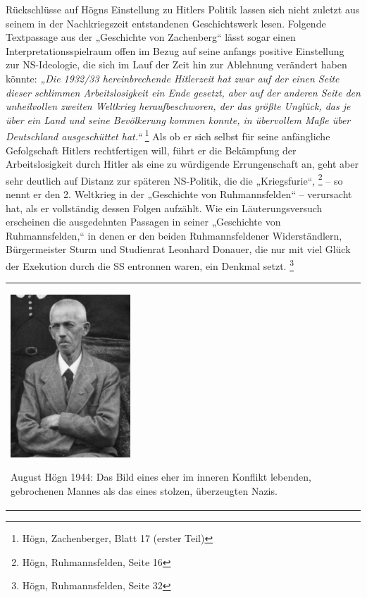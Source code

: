 Rückschlüsse auf Högns Einstellung zu Hitlers Politik lassen sich nicht
zuletzt aus seinem in der Nachkriegszeit entstandenen Geschichtswerk
lesen. Folgende Textpassage aus der „Geschichte von Zachenberg“ lässt
sogar einen Interpretationsspielraum offen im Bezug auf seine anfangs
positive Einstellung zur NS-Ideologie, die sich im Lauf der Zeit hin
zur Ablehnung verändert haben könnte: \textit{„Die 1932/33
hereinbrechende Hitlerzeit hat zwar auf der einen Seite dieser
schlimmen Arbeitslosigkeit ein Ende gesetzt, aber auf der anderen Seite
den unheilvollen zweiten Weltkrieg heraufbeschworen, der das größte
Unglück, das je über ein Land und seine Bevölkerung kommen konnte, in
übervollem Maße über Deutschland ausgeschüttet hat.“ } \footnote{Högn,
Zachenberger, Blatt 17 (erster Teil)}\textit{ }Als ob er sich selbst
für seine anfängliche Gefolgschaft Hitlers rechtfertigen will, führt er
die Bekämpfung der Arbeitslosigkeit durch Hitler als eine zu würdigende
Errungenschaft an, geht aber sehr deutlich auf Distanz zur späteren
NS-Politik, die die „Kriegsfurie“, \footnote{Högn, Ruhmannsfelden,
Seite 16} – so nennt er den 2. Weltkrieg in der „Geschichte von
Ruhmannsfelden“ – verursacht hat, als er vollständig dessen Folgen
aufzählt. Wie ein Läuterungsversuch erscheinen die ausgedehnten
Passagen in seiner „Geschichte von Ruhmannsfelden,“ in denen er den
beiden Ruhmannsfeldener Widerständlern, Bürgermeister Sturm und
Studienrat Leonhard Donauer, die nur mit viel Glück der Exekution durch
die SS entronnen waren, ein Denkmal setzt. \footnote{Högn,
Ruhmannsfelden, Seite 32}

\begin{center}
\begin{minipage}{4.928cm}
\begin{flushleft}
\tablefirsthead{}
\tablehead{}
\tabletail{}
\tablelasttail{}
\begin{supertabular}{m{4.728cm}}

\includegraphics[width=4.503cm,height=6.103cm]{pictures/zulassungsarbeit-img036.jpg}

August Högn 1944: Das Bild eines eher
im inneren Konflikt lebenden, gebrochenen Mannes als das eines stolzen,
überzeugten Nazis.\\
\end{supertabular}
\end{flushleft}
\end{minipage}
\end{center}


